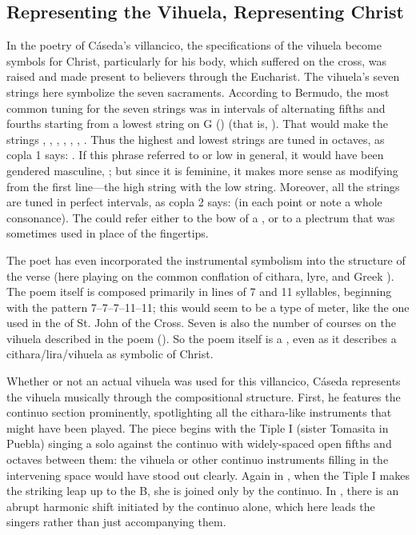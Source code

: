 \subsection{Representing the Vihuela, Representing Christ}

In the poetry of Cáseda's villancico, the specifications of the vihuela become
symbols for Christ, particularly for his body, which suffered on the cross, was
raised and made present to believers through the Eucharist.
The vihuela's seven strings here symbolize the seven sacraments.
According to Bermudo, the most common tuning for the seven strings was in
intervals of alternating fifths and fourths starting from a lowest string on G
() (that is, ).%
    \autocite[109r--109v]{Bermudo:Declaracion}
That would make the strings , , ,
, , , .
Thus the highest and lowest strings are tuned in octaves, as copla 1 says:
.
If this phrase referred to  or low in general, it
would have been gendered masculine, ; but since it
is feminine, it makes more sense as modifying  from the first
line---the high string with the low string.
Moreover, all the strings are tuned in perfect intervals, as copla 2 says:
 (in each point or note a whole
consonance).
The  could refer either to the bow of a , or
to a plectrum that was sometimes used in place of the fingertips.

The poet has even incorporated the instrumental symbolism into the structure of
the verse (here playing on the common conflation of cithara, lyre, and Greek
).
The poem itself is composed primarily in lines of 7 and 11 syllables, beginning
with the pattern 7--7--7--11--11; this would seem to be a type of 
meter, like the one used in the  of St. John of the
Cross.
Seven is also the number of courses on the vihuela described in the poem
().
So the poem itself is a , even as it describes a
cithara/lira/vihuela as symbolic of Christ.

Whether or not an actual vihuela was used for this villancico, Cáseda
represents the vihuela musically through the compositional structure.
First, he features the continuo section prominently, spotlighting all the
cithara-like instruments that might have been played.
The piece begins with the Tiple I (sister Tomasita in Puebla) singing a solo
against the continuo with widely-spaced open fifths and octaves between them:
the vihuela or other continuo instruments filling in the intervening space
would have stood out clearly.
Again in , when the Tiple I makes the striking leap up to the
B\fl{}, she is joined only by the continuo.
In , there is an abrupt harmonic shift initiated by the continuo
alone, which here leads the singers rather than just accompanying them.

